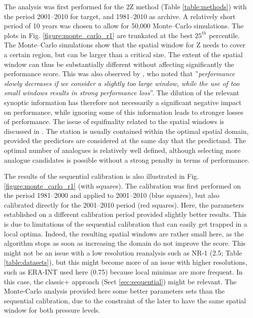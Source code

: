 \documentclass[review]{elsarticle}
\begin{document}
The analysis was first performed for the 2Z method (Table \ref{table:methods}) with the period 2001--2010 for target, and 1981--2010 as archive. A relatively short period of 10 years was chosen to allow for 50,000 Monte--Carlo simulations. The plots in Fig. \ref{figure:monte_carlo_r1} are trunkated at the best $25^{th}$ percentile. The Monte--Carlo simulations show that the spatial window for Z needs to cover a certain region, but can be larger than a critical size. The extent of the spatial window can thus be substantially different without affecting significantly the performance score. This was also observed by \citet{Bontron2004}, who noted that ''\textit{performance slowly decreases if we consider a slightly too large window, while the use of too small windows results in strong performance loss}''. The dilution of the relevant synoptic information has therefore not necessarily a significant negative impact on performance, while ignoring some of this information leads to stronger losses of performance. The issue of equifinality related to the spatial windows is discussed in \cite{Radanovics2013}. The station is usually contained within the optimal spatial domain, provided the predictors are considered at the same day that the predictand. The optimal number of analogues is relatively well defined, although selecting more analogue candidates is possible without a strong penalty in terms of performance.

The results of the sequential calibration is also illustrated in Fig. \ref{figure:monte_carlo_r1} (with squares). The calibration was first performed on the period 1981--2000 and applied to 2001--2010 (blue squares), but also calibrated directly for the 2001--2010 period (red squares). Here, the parameters established on a different calibration period provided slightly better results. This is due to limitations of the sequential calibration that can easily get trapped in a local optima. Indeed, the resulting spatial windows are rather small here, as the algorithm stops as soon as increasing the domain do not improve the score. This might not be an issue with a low resolution reanalysis such as NR-1 (2.5\degree; Table \ref{table:datasets}), but this might become more of an issue with higher resolutions, such as ERA-INT used here (0.75\degree) because local minimas are more frequent. In this case, the classic+ approach (Sect \ref{sec:sequential}) might be relevant. The Monte-Carlo analysis provided here some better parameters sets than the sequential calibration, due to the constraint of the later to have the same spatial window for both pressure levels. 
\end{document}
